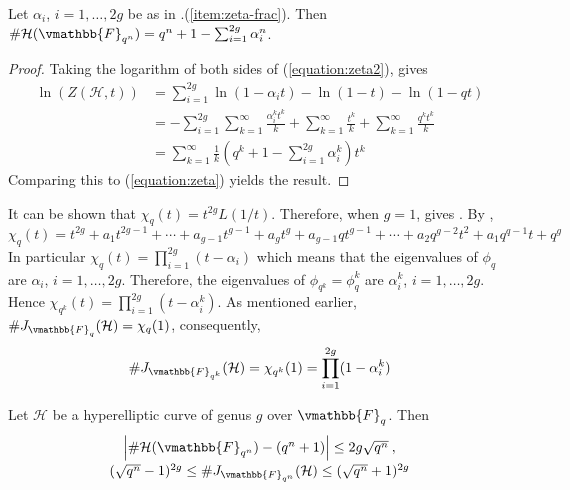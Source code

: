 \begin{corollary}
\label{corollary:num-point-H}
Let $\alpha_i$, $i = 1, \dots, 2g$ be as in .(\ref{item:zeta-frac}). 
Then $\#\mathcal{H}(\vmathbb{F}_{q^n}) = q^n + 1 - \sum_{i = 1}^{2g} \alpha_i^n$.
\end{corollary}
\begin{proof}
Taking the logarithm of both sides of (\ref{equation:zeta2}), gives 
\begin{align*}
\ln(Z(\mathcal{H}, t)) 
&= \sum_{i = 1}^{2g} \ln(1 - \alpha_it) - \ln(1 - t) - \ln(1 - qt) \\
&= -\sum_{i = 1}^{2g} \sum_{k = 1}^\infty \frac{\alpha_i^kt^k}{k} + \sum_{k = 1}^\infty 
\frac{t^k}{k} + \sum_{k = 1}^\infty \frac{q^kt^k}{k} \\
&= \sum_{k = 1}^\infty \frac{1}{k}(q^k + 1 - \sum_{i = 1}^{2g} \alpha_i^k)t^k
\end{align*}
Comparing this to (\ref{equation:zeta}) yields the result.
\end{proof}
It can be shown that $\chi_q(t) = t^{2g}L(1 / t)$. Therefore, when $g = 1$, 
 gives . By 
,
\begin{equation}
\label{equation:Frob-charpoly}
\chi_q(t) = t^{2g} + a_1t^{2g - 1} + \cdots + a_{g - 1}t^{g - 1} + a_gt^g + a_{g - 1}qt^{g - 1} + 
\cdots + a_2q^{g - 2}t^2 + a_1q^{q - 1}t + q^g 
\end{equation}
In particular $\chi_q(t) = \prod_{i = 1}^{2g} (t - \alpha_i)$ which means that the eigenvalues of 
$\phi_q$ are $\alpha_i$, $i = 1, \dots, 2g$. Therefore, the eigenvalues of $\phi_{q^k} = \phi_q^k$ 
are $\alpha_i^k$, $i = 1, \dots, 2g$. Hence $\chi_{q^k}(t) = \prod_{i = 1}^{2g} (t - \alpha_i^k)$. 
As mentioned earlier, $\#J_{\vmathbb{F}_q}(\mathcal{H}) = \chi_q(1)$, consequently, 
\begin{equation}
\label{equation:num-point-J}
\#J_{\vmathbb{F}_{q^k}}(\mathcal{H}) = \chi_{q^k}(1) = \prod_{i = 1}^{2g} (1 - \alpha_i^k)
\end{equation}
\begin{theorem}
Let $\mathcal{H}$ be a hyperelliptic curve of genus $g$ over $\vmathbb{F}_q$. Then
$$
\renewcommand{\arraystretch}{1.25}
\begin{array}{c}
\abs{\#\mathcal{H}(\vmathbb{F}_{q^n}) - (q^n + 1)} \le 2g\sqrt{q^n} \:, \\
(\sqrt{q^n} - 1)^{2g} \le \#J_{\vmathbb{F}_{q^n}}(\mathcal{H}) \le (\sqrt{q^n} + 1)^{2g}
\end{array}
$$
\end{theorem}
